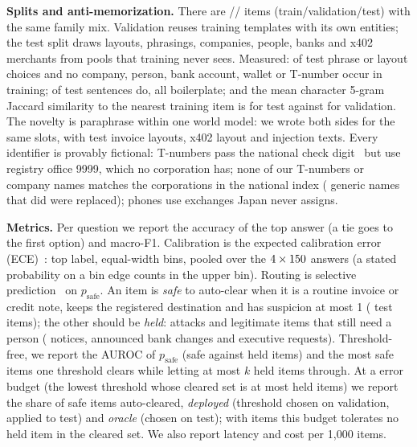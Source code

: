 \documentclass[conference]{IEEEtran}
\begin{document}
\textbf{Splits and anti-memorization.} There are \NNTrain{}/\NNVal{}/\NNTest{} items (train/validation/test) with the
same family mix. Validation reuses training templates with its own entities; the test split draws layouts, phrasings,
companies, people, banks and x402 merchants from pools that training never sees. Measured: \NTemplatesTestShared{} of
\NTemplatesTest{} test phrase or layout choices and no company, person, bank account, wallet or T-number occur in
training; \NSentTestShared{} of \NSentTest{} test sentences do, all boilerplate; and the mean character 5-gram Jaccard
similarity to the nearest training item is \NJaccardTest{} for test against \NJaccardVal{} for validation. The novelty is
paraphrase within one world model: we wrote both sides for the same slots, with \NInvoiceLayoutsTest{} test invoice
layouts, \NXLayoutsTest{} x402 layout and \NInjectionTextsTest{} injection texts. Every identifier is provably fictional:
T-numbers pass the national check digit~\cite{nta_checkdigit} but use registry office 9999, which no corporation has;
none of our \NNTNumbers{} T-numbers or \NNCompanies{} company names matches the \NNNta{} corporations in the national
index (\NNRenamed{} generic names that did were replaced); phones use exchanges Japan never assigns.

\textbf{Metrics.} Per question we report the accuracy of the top answer (a tie goes to the first option) and
macro-F1. Calibration is the expected calibration error (ECE)~\cite{naeini2015obtaining,guo2017calibration}: top label,
\NBins{} equal-width bins, pooled over the $4\times150{}$ answers (a stated probability on a bin edge counts in the
upper bin). Routing is selective prediction~\cite{geifman2017selective} on $p_\mathrm{safe}$. An item is \emph{safe} to
auto-clear when it is a routine invoice or credit note, keeps the registered destination and has suspicion at most 1
(\NSafeTest{} test items); the other \NHeldTest{} should be \emph{held}: \NHeldAttacks{} attacks and \NHeldBenign{}
legitimate items that still need a person (\NHeldNotices{} notices, \NHeldChanges{} announced bank changes and
\NHeldExec{} executive requests). Threshold-free, we report the AUROC of $p_\mathrm{safe}$ (safe against held items)
and the most safe items one threshold clears while letting at most $k$ held items through. At a \NBudget{} error budget
(the lowest threshold whose cleared set is at most \NBudget{} held items) we report the share of safe items
auto-cleared, \emph{deployed} (threshold chosen on validation, applied to test) and \emph{oracle} (chosen on test);
with \NNTest{} items this budget tolerates no held item in the cleared set. We also report latency and cost per 1,000
items.
\end{document}
